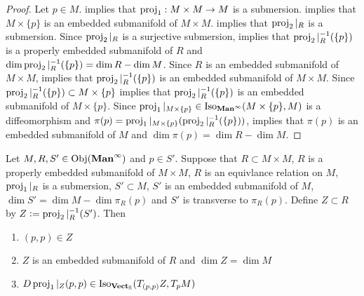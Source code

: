 \documentclass{book}
\begin{document}
	\begin{proof}
		Let $p \in M$.  implies that $\operatorname{\text{proj}}_1: M \times M \rightarrow M$ is a submersion. \rex{} implies that $M \times \{p\}$ is an embedded submanifold of $M \times M$.  implies that $\operatorname{\text{proj}}_2|_R$ is a submersion. Since $\operatorname{\text{proj}}_2|_R$ is a surjective submersion,  implies that $\operatorname{\text{proj}}_2|_R^{-1}(\{p\})$ is a properly embedded submanifold of $R$ and $\dim \operatorname{\text{proj}}_2|_R^{-1}(\{p\}) = \dim R - \dim M$. Since $R$ is an embedded submanifold of $M \times M$,   implies that $\operatorname{\text{proj}}_2|_R^{-1}(\{p\})$ is an embedded submanifold of $M \times M$. Since $\operatorname{\text{proj}}_2|_R^{-1}(\{p\}) \subset M \times \{p\}$  implies that $\operatorname{\text{proj}}_2|_R^{-1}(\{p\})$ is an embedded submanifold of $M \times \{p\}$. Since $\operatorname{\text{proj}}_1|_{M \times \{p\}} \in \operatorname{Iso}_{\operatorname*{\text{\textbf{Man}}^{\infty}}}(M \times \{p\}, M)$ is a diffeomorphism and $\pi(p) = \operatorname{\text{proj}}_1|_{M \times \{p\}}(\operatorname{\text{proj}}_2|_R^{-1}(\{p\}))$,   implies that $\pi(p)$ is an embedded submanifold of $M$ and $\dim \pi(p) = \dim R - \dim M$.
	\end{proof}

	\begin{ex} 
		Let $M, R, S' \in \operatorname{Obj}(\operatorname*{\text{\textbf{Man}}^{\infty}})$ and $p \in S'$. Suppose that $R \subset M \times M$, $R$ is a properly embedded submanifold of $M \times M$, $R$ is an equivlance relation on $M$, $\operatorname{\text{proj}}_1|_R$ is a submersion, $S' \subset M$, $S'$ is an embedded submanifold of $M$, $\dim S' = \dim M - \dim \pi_R(p)$ and $S'$ is transverse to $\pi_R(p)$. Define $Z \subset R$ by $Z \vcentcolon= \operatorname{\text{proj}}_2|_R^{-1}(S')$. Then 
		\begin{enumerate}
			\item $(p,p) \in Z$
			\item $Z$ is an embedded submanifold of $R$ and $\dim Z = \dim M$
			\item $D\operatorname{\text{proj}}_1|_Z(p,p) \in \operatorname{Iso}_{\operatorname*{\text{\textbf{Vect}}_{\mathbb{R}}}}(T_{(p,p)}Z, T_pM)$
		\end{enumerate}
	\end{ex}
\end{document}
